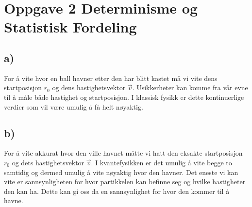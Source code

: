 \documentclass{article}
\begin{document}
\newpage
\section*{Oppgave 2 Determinisme og Statistisk Fordeling}
\subsection*{a)}
For å vite hvor en ball havner etter den har blitt kastet må vi vite dens startposisjon $r_0$ og dens hastighetsvektor $\vec{v}$. Usikkerheter kan komme fra vår evne til å måle både hastighet og startposisjon. I klassisk fysikk er dette kontinuerlige verdier som vil være umulig å få helt nøyaktig. 

\subsection*{b)}
For å vite akkurat hvor den ville havnet måtte vi hatt den eksakte startposisjon $r_0$ og dets hastighetsvektor $\vec{v}$. I kvantefysikken er det umulig å vite begge to samtidig og dermed umulig å vite nøyaktig hvor den havner. Det eneste vi kan vite er sannsynligheten for hvor partikkelen kan befinne seg og hvilke hastigheter den kan ha. Dette kan gi oss da en sannsynlighet for hvor den kommer til å havne. 
\end{document}
